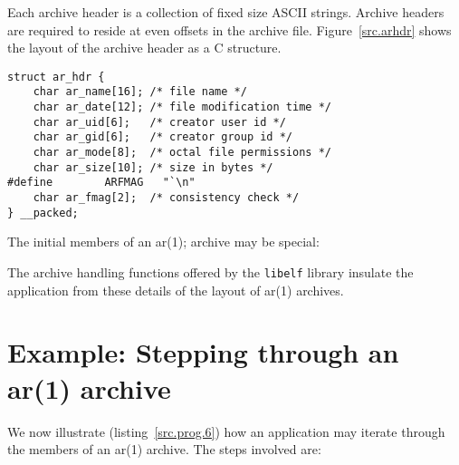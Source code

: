 \documentclass[a4paper,pdftex]{book}
\newcommand{\firstterm}[1]{\textit{#1}}
\newcommand{\library}[1]{\texttt{#1}}
\newcommand{\parameter}[1]{\texttt{#1}}
\newcommand{\tool}[1]{\textbf{#1}}
\begin{document}
Each archive header is a collection of fixed size ASCII
strings. Archive headers are required
to reside at even offsets in the archive file.
Figure~\vref{src.arhdr} shows the layout of the archive header as a C
structure.

\begin{lstlisting}[caption=Archive Header Layout, label=src.arhdr]
struct ar_hdr {
    char ar_name[16]; /* file name */
    char ar_date[12]; /* file modification time */
    char ar_uid[6];   /* creator user id */
    char ar_gid[6];   /* creator group id */
    char ar_mode[8];  /* octal file permissions */
    char ar_size[10]; /* size in bytes */
#define        ARFMAG   "`\n"
    char ar_fmag[2];  /* consistency check */
} __packed;
\end{lstlisting}

The initial members of an ar(1); archive may be special:


The archive handling functions offered by the \library{libelf} library
insulate the application from these details of the layout of
ar(1) archives.

\section{Example: Stepping through an ar(1) archive}

We now illustrate (listing~\vref{src.prog.6}) how an application may
iterate through the members of an ar(1) archive.  The steps involved
are:
\end{document}
